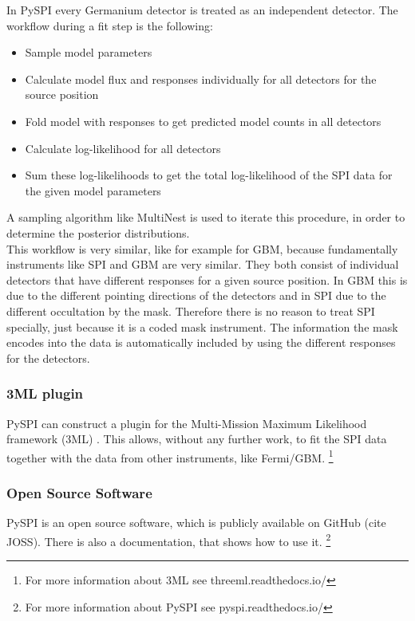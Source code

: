 \documentclass[twocolumn]{aa}
\begin{document}
In PySPI every Germanium detector is treated as an independent detector. The workflow during a fit step is the following:
\begin{itemize}
  \item Sample model parameters
  \item Calculate model flux and responses individually for all detectors for the source position
  \item Fold model with responses to get predicted model counts in all detectors
  \item Calculate log-likelihood for all detectors
  \item Sum these log-likelihoods to get the total log-likelihood of the SPI data for the given model parameters
\end{itemize}
A sampling algorithm like MultiNest \citep{multinest} is used to iterate this procedure, in order to determine the posterior distributions.\\
This workflow is very similar, like for example for GBM, because fundamentally instruments like SPI and GBM are very similar. They both consist of individual detectors that have different responses for a given source position. In GBM this is due to the different pointing directions of the detectors and in SPI due to the different occultation by the mask. Therefore there is no reason to treat SPI specially, just because it is a coded mask instrument. The information the mask encodes into the data is automatically included by using the different responses for the detectors.

\subsubsection*{3ML plugin}

PySPI can construct a plugin for the Multi-Mission Maximum Likelihood framework (3ML) \citep{3ML}. This allows, without any further work, to fit the SPI data together with the data from other instruments, like Fermi/GBM. \footnote{For more information about 3ML see threeml.readthedocs.io/}

\subsubsection*{Open Source Software}

PySPI is an open source software, which is publicly available on GitHub (cite JOSS). There is also a documentation, that shows how to use it. \footnote{For more information about PySPI see pyspi.readthedocs.io/}
\end{document}

